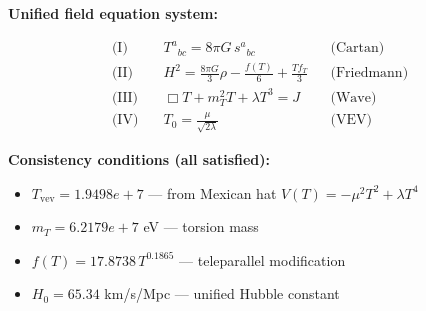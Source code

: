 
\textbf{Unified field equation system:}

\begin{align}
  \text{(I)} \quad & T^a{}_{bc} = 8\pi G \, s^a{}_{bc} && \text{(Cartan)} \\
  \text{(II)} \quad & H^2 = \frac{8\pi G}{3}\rho - \frac{f(T)}{6} + \frac{Tf_T}{3} && \text{(Friedmann)} \\
  \text{(III)} \quad & \Box T + m_T^2 T + \lambda T^3 = J && \text{(Wave)} \\
  \text{(IV)} \quad & T_0 = \frac{\mu}{\sqrt{2\lambda}} && \text{(VEV)}
\end{align}

\textbf{Consistency conditions (all satisfied):}
\begin{itemize}
  \item $T_{\text{vev}} = 1.9498e+7$ — from Mexican hat $V(T) = -\mu^2 T^2 + \lambda T^4$
  \item $m_T = 6.2179e+7$ eV — torsion mass
  \item $f(T) = 17.8738 \, T^{0.1865}$ — teleparallel modification
  \item $H_0 = 65.34$ km/s/Mpc — unified Hubble constant
\end{itemize}